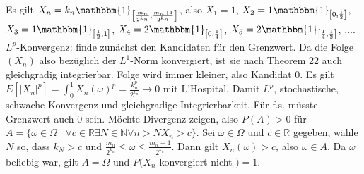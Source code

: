 \documentclass{article}
\begin{document}
Es gilt $X_n=k_n\mathbbm{1}_{\left[\frac{m_n}{2^{k_n}},\frac{m_n+1}{2^{k_n}}\right]}$, also $X_1=1$, $X_2=1\mathbbm{1}_{\left[0,\frac{1}{2}\right]}$, $X_3=1\mathbbm{1}_{\left[\frac{1}{2},1\right]}$, $X_4=2\mathbbm{1}_{\left[0,\frac{1}{4}\right]}$, $X_5=2\mathbbm{1}_{\left[\frac{1}{4},\frac{1}{2}\right]}$, $\dots$.
$L^p$-Konvergenz: finde zunächst den Kandidaten für den Grenzwert.
Da die Folge $(X_n)$ also bezüglich der $L^1$-Norm konvergiert, ist sie nach Theorem 22 auch gleichgradig integrierbar. Folge wird immer kleiner, also Kandidat 0.
Es gilt $E[|X_n|^p]=\int_0^1 X_n(\omega)^p=\frac{k_n^p}{2^{k_n}}\to0$ mit L'Hospital.
Damit $L^p$, stochastische, schwache Konvergenz und gleichgradige Integrierbarkeit.
Für f.s. müsste Grenzwert auch 0 sein.
Möchte Divergenz zeigen, also $P(A)>0$ für $A=\{\omega\in\Omega\mid\forall c\in\mathbb{R}\exists N\in\mathbb{N}\forall n>N X_n>c\}$.
Sei $\omega\in\Omega$ und $c\in\mathbb{R}$ gegeben, wähle $N$ so, dass $k_N>c$ und $\frac{m_n}{2^{k_n}}\leq\omega\leq\frac{m_n+1}{2^{k_n}}$.
Dann gilt $X_n(\omega)>c$, also $\omega\in A$.
Da $\omega$ beliebig war, gilt $A=\Omega$ und $P(X_n$ konvergiert nicht $)=1$.

\end{document}

